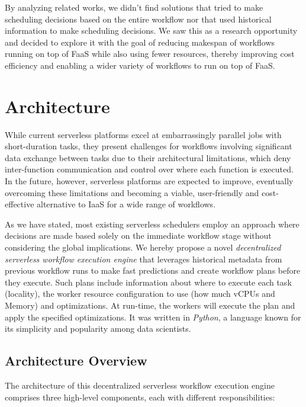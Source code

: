 \documentclass[conference]{IEEEtran}
\begin{document}
By analyzing related works, we didn't find solutions that tried to make scheduling decisions based on the entire workflow nor that used historical information to make scheduling decisions. We saw this as a research opportunity and decided to explore it with the goal of reducing makespan of workflows running on top of FaaS while also using fewer resources, thereby improving cost efficiency and enabling a wider variety of workflows to run on top of FaaS.

\section{Architecture}
\label{s:architecture}

While current serverless platforms excel at embarrassingly parallel jobs with short-duration tasks, they present challenges for workflows involving significant data exchange between tasks due to their architectural limitations, which deny inter-function communication and control over where each function is executed. In the future, however, serverless platforms are expected to improve, eventually overcoming these limitations and becoming a viable, user-friendly and cost-effective alternative to IaaS for a wide range of workflows.

As we have stated, most existing serverless schedulers employ an approach where decisions are made based solely on the immediate workflow stage without considering the global implications. We hereby propose a novel \textit{decentralized serverless workflow execution engine} that leverages historical metadata from previous workflow runs to make fast predictions and create workflow plans before they execute. Such plans include information about where to execute each task (locality), the worker resource configuration to use (how much vCPUs and Memory) and optimizations. At run-time, the workers will execute the plan and apply the specified optimizations. It was written in \textit{Python}, a language known for its simplicity and popularity among data scientists.

\subsection{Architecture Overview}

The architecture of this decentralized serverless workflow execution engine comprises three high-level components, each with different responsibilities:
\end{document}
